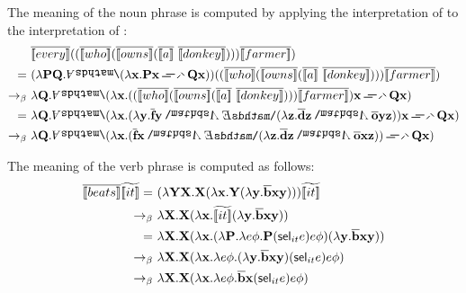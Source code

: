 \begin{example}
The meaning of the noun phrase  is computed by applying the interpretation of  to the interpretation of : 
\begin{align}
& \tr{\I{every}}  ((\tr{\I{who}}  (\tr{\I{owns}}  (\tr{\I{a}} \ \tr{\I{donkey}} ) )) \tr{\I{farmer}}  )  \notag \\
= \ & (\lambda \P2 \Q2. \all2 (\lambda \x2.  \P2 \x2 \impK2 \Q2 \x2 ) ) ((\tr{\I{who}}  (\tr{\I{owns}}  (\tr{\I{a}} \ \tr{\I{donkey}} ) )) \tr{\I{farmer}}  )  \notag \\
\bconv \ & \lambda \Q2. \all2 (\lambda \x2.  ((\tr{\I{who}}  (\tr{\I{owns}}  (\tr{\I{a}} \ \tr{\I{donkey}} ) )) \tr{\I{farmer}}  ) \x2 \impK2 \Q2 \x2 )   \notag \\
= \ & \lambda \Q2. \all2 (\lambda \x2.  (\lambda  \y2.  \tr{\cfarmer}  \y2 \cnj2   \ex2 (\lambda \z2. \tr{\cdonkey}  \z2  \cnj2  \tr{\cown}  \y2 \z2  )   ) \x2 \impK2 \Q2 \x2)    \notag \\
\bconv \ & \lambda \Q2. \all2 (\lambda \x2.  ( \tr{\cfarmer}  \x2 \cnj2   \ex2 (\lambda \z2.  \tr{\cdonkey}  \z2  \cnj2  \tr{\cown}  \x2 \z2  ) )  \impK2 \Q2 \x2)   \label{eq:everyfarmerwhoownsadonkey}
\end{align}

The meaning of the verb phrase  is computed as follows:
\begin{align}
\tr{\I{beats}}  \etr{\I{it}}  = \ &  (\lambda \Y2 \X2. \X2 ( \lambda \x2. \Y2 (\lambda \y2.  \tr{\cbeat}  \x2 \y2 ))) \etr{\I{it}} \notag  \\
\bconv \ &  \lambda  \X2. \X2 ( \lambda \x2.  \etr{\I{it}}  (\lambda \y2.  \tr{\cbeat}  \x2 \y2 ))\notag  \\
= \ & \lambda  \X2. \X2 ( \lambda \x2.  ( \lambda \P2. \lambda e \phi. \P2 ( \selK_{it} e ) e \phi)    (\lambda \y2.  \tr{\cbeat}  \x2 \y2 ))\notag  \\
\bconv \ & \lambda  \X2. \X2 ( \lambda \x2.   \lambda e \phi.  (\lambda \y2.  \tr{\cbeat}  \x2 \y2 ) ( \selK_{it} e ) e \phi  )\notag  \\
\bconv \ & \lambda  \X2. \X2 ( \lambda \x2.   \lambda e \phi.  \tr{\cbeat}  \x2 ( \selK_{it} e ) e \phi  ) \label{eq:beatsit}
\end{align}


\end{example}
